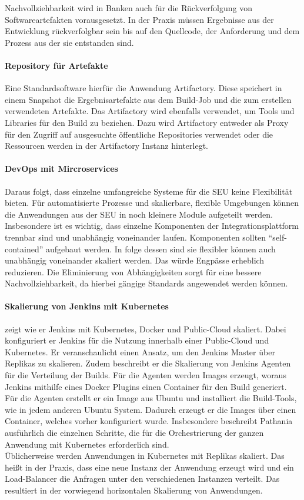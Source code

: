 Nachvollziehbarkeit wird in Banken auch für die Rückverfolgung von Softwareartefakten vorausgesetzt. In der Praxis müssen Ergebnisse aus der Entwicklung rückverfolgbar sein bis auf den Quellcode, der Anforderung und dem Prozess aus der sie entstanden sind.

\paragraph{Repository für Artefakte}
Eine Standardsoftware hierfür die Anwendung Artifactory. Diese speichert in einem Snapshot die Ergebnisartefakte aus dem Build-Job und die zum erstellen verwendeten Artefakte. Das Artifactory wird ebenfalls verwendet, um Tools und Libraries für den Build zu beziehen. Dazu wird Artifactory entweder als Proxy für den Zugriff auf ausgesuchte öffentliche Repositories verwendet oder die Ressourcen werden in der Artifactory Instanz hinterlegt.

\paragraph{DevOps mit Mircroservices}
Daraus folgt, dass einzelne umfangreiche Systeme für die \ac{SEU} keine Flexibilität bieten. Für automatisierte Prozesse und skalierbare, flexible Umgebungen können die Anwendungen aus der \ac{SEU} in noch kleinere Module aufgeteilt werden. Insbesondere ist es wichtig, dass einzelne Komponenten der Integrationsplattform trennbar sind und unabhängig voneinander laufen. Komponenten sollten \enquote{self-contained} aufgebaut werden. In folge dessen sind sie flexibler können auch unabhängig voneinander skaliert werden. Das würde Engpässe erheblich reduzieren. Die Eliminierung von Abhängigkeiten sorgt für eine bessere Nachvollziehbarkeit, da hierbei gängige Standards angewendet werden können.

\paragraph{Skalierung von Jenkins mit Kubernetes}
\label{jenkins:skalierung}
\citet{Pathania2017} zeigt wie er Jenkins mit Kubernetes, Docker und Public-Cloud skaliert. Dabei konfiguriert er Jenkins für die Nutzung innerhalb einer Public-Cloud und Kubernetes. Er veranschaulicht einen Ansatz, um den Jenkins Master über Replikas zu skalieren. Zudem beschreibt er die Skalierung von Jenkins Agenten für die Verteilung der Builds. Für die Agenten werden Images erzeugt, woraus Jenkins mithilfe eines Docker Plugins einen Container für den Build generiert. Für die Agenten erstellt er ein Image aus Ubuntu und installiert die Build-Tools, wie in jedem anderen Ubuntu System.
Dadurch erzeugt er die Images über einen Container, welches vorher konfiguriert wurde. Insbesondere beschreibt Pathania ausführlich die einzelnen Schritte, die für die Orchestrierung der ganzen Anwendung mit Kubernetes erforderlich sind.
\medskip
\\
Üblicherweise werden Anwendungen in Kubernetes mit Replikas skaliert. Das heißt in der Praxis, dass eine neue Instanz der Anwendung erzeugt wird und ein Load-Balancer die Anfragen unter den verschiedenen Instanzen verteilt. Das resultiert in der vorwiegend horizontalen Skalierung von Anwendungen. 

